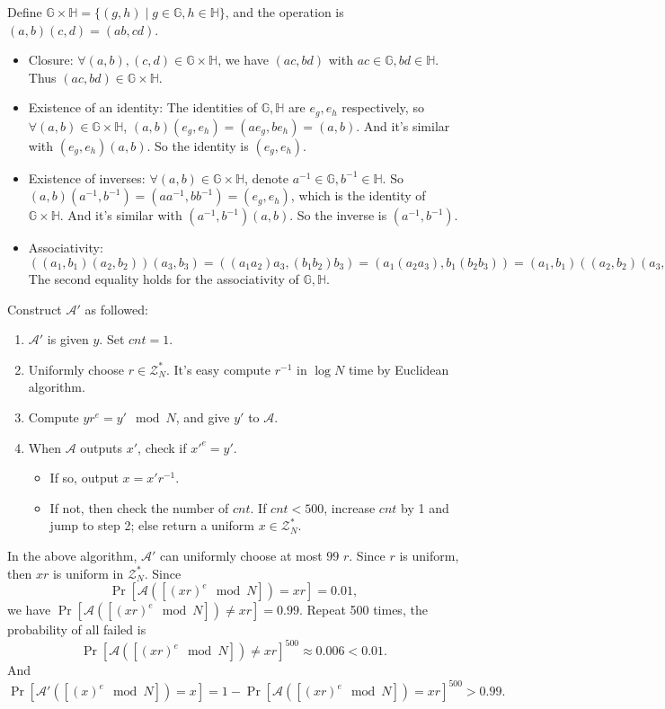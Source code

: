 \documentclass[a4paper]{article}
\newcommand{\G}{\mathbb{G}}
\newcommand{\Z}{\mathcal{Z}}
\newcommand{\h}{\mathbb{H}}
\newcommand{\A}{\mathcal{A}}
\newenvironment{problem}[2][Problem]{\begin{trivlist}
\item[\hskip \labelsep {\bfseries #1}\hskip \labelsep {\bfseries #2.}]}{\end{trivlist}}
\begin{document}
\begin{problem}{8.8} 
Define $\G\times\h=\{(g,h)\mid g\in\G,h\in\h\}$, and the operation is $(a,b)(c,d)=(ab,cd)$.
\begin{itemize}
    \item Closure: 
    $\forall (a,b),(c,d)\in \G\times \h$, we have $(ac,bd)$ with $ac\in\G,bd\in\h$. 
    Thus $(ac,bd)\in \G\times \h$.
    \item Existence of an identity: 
    The identities of $\G,\h$ are $e_g,e_h$ respectively, so $\forall (a,b)\in \G\times \h$, $(a,b)(e_g,e_h)=(ae_g,be_h)=(a,b)$. 
    And it's similar with $(e_g,e_h)(a,b)$. So the identity is $(e_g,e_h)$.
    \item Existence of inverses: 
    $\forall (a,b)\in \G\times \h$, denote $a^{-1}\in\G,b^{-1}\in\h$. 
    So $(a,b)(a^{-1},b^{-1})=(aa^{-1},bb^{-1})=(e_g,e_h)$, which is the identity of $\G\times\h$. 
    And it's similar with $(a^{-1},b^{-1})(a,b)$. So the inverse is $(a^{-1},b^{-1})$.
    \item Associativity: $((a_1,b_1)(a_2,b_2))(a_3,b_3)=((a_1a_2)a_3,(b_1b_2)b_3)=(a_1(a_2a_3),b_1(b_2b_3))=(a_1,b_1)((a_2,b_2)(a_3,b_3)).$
    The second equality holds for the associativity of $\G,\h$.
    \end{itemize}
\end{problem}

\begin{problem}{8.14}
Construct $\A'$ as followed:
\begin{enumerate}
    \item $\A'$ is given $y$. Set $cnt=1$.
    \item Uniformly choose $r\in\Z_N^*$. It's easy compute $r^{-1}$ in $\log N$ time by Euclidean algorithm. 
    \item Compute $yr^e=y'\mod N$, and give $y'$ to $\A$.
    \item When $\A$ outputs $x'$, check if $x'^e=y'$.
        \begin{itemize}
            \item If so, output $x=x'r^{-1}$.
            \item If not, then check the number of $cnt$. If $cnt<500$, increase $cnt$ by 1 and jump to step 2; else return a uniform $x\in\Z_N^*$.
        \end{itemize}
\end{enumerate}
In the above algorithm, $\A'$ can uniformly choose at most $99$ $r$. Since $r$ is uniform, then $xr$ is uniform in $\Z_N^*$. Since 
$$\Pr[\A([(xr)^e\mod N])=xr]=0.01,$$
we have $\Pr[\A([(xr)^e\mod N])\ne xr]=0.99$. Repeat 500 times, the probability of all failed is $$\Pr[\A([(xr)^e\mod N])\ne xr]^{500}\approx 0.006<0.01.$$ And $$\Pr[\A'([(x)^e\mod N])=x]=1-\Pr[\A([(xr)^e\mod N])=xr]^{500}>0.99.$$
\end{problem}
\end{document}
